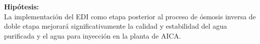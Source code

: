 \textbf{ Hipótesis:}\\
La implementación del EDI como etapa posterior al proceso de ósmosis inversa de doble etapa mejorará significativamente la calidad y estabilidad del agua purificada y el agua para inyección en la planta de AICA.

